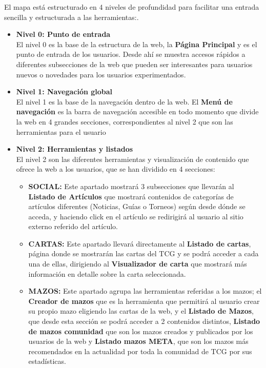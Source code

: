 \documentclass[10pt]{article}
\begin{document}
	El mapa está estructurado en 4 niveles de profundidad para facilitar una entrada sencilla y estructurada a las herramientas:.\\
	\begin{itemize}
		\item \textbf{Nivel 0: Punto de entrada}\\
			El nivel 0 es la base de la estructura de la web, la \textbf{Página Principal} y es el punto de entrada de los usuarios. Desde ahí se muestra accesos rápidos a diferentes subsecciones de la web que pueden ser interesantes para usuarios nuevos o novedades para los usuarios experimentados.\\
		\item \textbf{Nivel 1: Navegación global}\\
			El nivel 1 es la base de la navegación dentro de la web. El \textbf{Menú de navegación} es la barra de navegación accesible en todo momento que divide la web en 4 grandes secciones, correspondientes al nivel 2 que son las herramientas para el usuario\\
		\item \textbf{Nivel 2: Herramientas y listados}\\
			El nivel 2 son las diferentes herramientas y visualización de contenido que ofrece la web a los usuarios, que se han dividido en 4 secciones:
			\begin{itemize}
				\item \textbf{SOCIAL:} Este apartado mostrará 3 subsecciones que llevarán al \textbf{Listado de Artículos} que mostrará contenidos de  categorías de artículos diferentes (Noticias, Guías o Torneos) según desde dónde se acceda, y haciendo click en el artículo se redirigirá al usuario al sitio externo referido del artículo.
				\item \textbf{CARTAS:} Este apartado llevará directamente al \textbf{Listado de cartas}, página donde se mostrarán las cartas del TCG y se podrá acceder a cada una de ellas, dirigiendo al \textbf{Visualizador de carta} que mostrará más información en detalle sobre la carta seleccionada.
				\item \textbf{MAZOS:} Este apartado agrupa las herramientas referidas a los mazos; el \textbf{Creador de mazos} que es la herramienta que permitirá al usuario crear su propio mazo eligiendo las cartas de la web, y el \textbf{Listado de Mazos}, que desde esta sección se podrá acceder a 2 contenidos distintos, \textbf{Listado de mazos comunidad} que son los mazos creados y publicados por los usuarios de la web y \textbf{Listado mazos META}, que son los mazos más recomendados en la actualidad por toda la comunidad de TCG por sus estadísticas.

\end{itemize}
\end{itemize}
\end{document}
